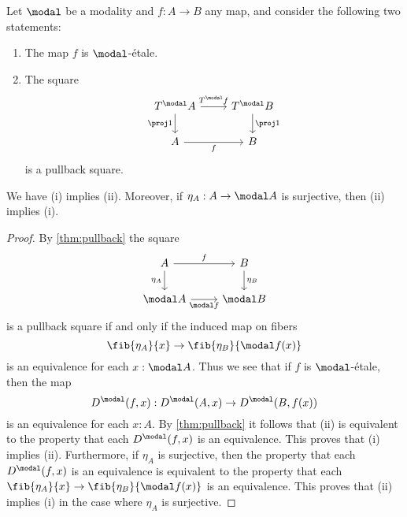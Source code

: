 \documentclass{msc}
\begin{document}
\begin{prp}\label{lem:etale_char}
  Let $\modal$ be a modality and $f:A\to B$ any map, and consider the following two statements:
  \begin{enumerate}
  \item The map $f$ is $\modal$-\'etale.
  \item The square
    \begin{equation*}
      \begin{tikzcd}
        T^\modal A \arrow[r,"T^\modal f"] \arrow[d,swap,"\proj 1"] & T^\modal B \arrow[d,"\proj 1"] \\
        A \arrow[r,swap,"f"] & B
      \end{tikzcd}
    \end{equation*}
    is a pullback square.
  \end{enumerate}
  We have (i) implies (ii). Moreover, if $\eta_A:A\to\modal A$ is surjective, then (ii) implies (i).
\end{prp}

\begin{proof}
  By \cref{thm:pullback} the square
  \begin{equation*}
    \begin{tikzcd}
      A \arrow[r,"f"] \arrow[d,swap,"\eta_A"] & B \arrow[d,"\eta_B"] \\
      \modal A \arrow[r,swap,"\modal f"] & \modal B
    \end{tikzcd}
  \end{equation*}
  is a pullback square if and only if the induced map on fibers
  \begin{equation*}
    \fib{\eta_A}{x}\to \fib{\eta_B}{\modal f(x)}
  \end{equation*}
  is an equivalence for each $x:\modal A$. Thus we see that if $f$ is $\modal$-\'etale, then the map
  \begin{equation*}
    D^\modal(f,x) : D^\modal(A,x)\to D^\modal(B,f(x))
  \end{equation*}
  is an equivalence for each $x:A$. By \cref{thm:pullback} it follows that (ii) is equivalent to the property that each $D^\modal(f,x)$ is an equivalence. This proves that (i) implies (ii). Furthermore, if $\eta_A$ is surjective, then the property that each $D^\modal(f,x)$ is an equivalence is equivalent to the property that each $\fib{\eta_A}{x}\to \fib{\eta_B}{\modal f(x)}$ is an equivalence. This proves that (ii) implies (i) in the case where $\eta_A$ is surjective.
\end{proof}
\end{document}
